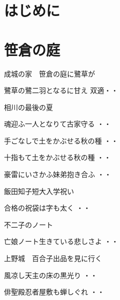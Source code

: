 \documentclass[b5paper]{tbook}[tombow]
\begin{document}
\chapter*{はじめに}
%
\chapter{笹倉の庭}
成城の家　笹倉の庭に鷺草が
\begin{shiika}鷺草の鷺二羽となるに甘え
\hfill{双適・・}\end{shiika}
\vspace{0.4cm}
相川の最後の夏
\begin{shiika}魂迎ふ一人となりて古家守る
\hfill{・・}\end{shiika}
\vspace{0.4cm}
\begin{shiika}手ごなしで土をかぶせる秋の種
\hfill{・・}\end{shiika}
\begin{shiika}十指もて土をかぶせる秋の種
\hfill{・・}\end{shiika}
\begin{shiika}豪雷にいさかふ妹弟抱き合ふ
\hfill{・・}\end{shiika}
\vspace{0.4cm}
飯田知子短大入学祝い
\begin{shiika}合格の祝袋は字も太く
\hfill{・・}\end{shiika}
\vspace{0.4cm}
不二子のノート
\begin{shiika}亡娘ノート生きている悲しさよ
\hfill{・・}\end{shiika}
上野城　百合子出品を見に行く
\begin{shiika}風凉し天主の床の黒光り
\hfill{・・}\end{shiika}
\vspace{ 0.4cm}
\begin{shiika}俳聖殿忍者屋敷も蝉しぐれ
\hfill{・・}\end{shiika}
\vspace{ 0.4cm}
\vspace{ 0.4cm}
\end{document}

